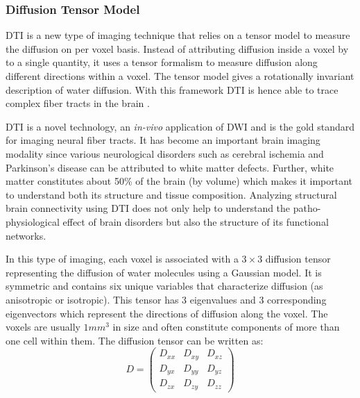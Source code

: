 \documentclass[msthesis.tex]{subfiles}
\begin{document}
\subsubsection{Diffusion Tensor Model}
\label{subsec:DTI}
\gls{DTI} is a new type of imaging technique that relies on a tensor model to measure the diffusion on per voxel basis. Instead of attributing diffusion inside a voxel by to a single quantity, it uses a tensor formalism to measure diffusion along different directions within a voxel. The tensor model gives a rotationally invariant description of water diffusion. With this framework \gls{DTI} is hence able to trace complex fiber tracts in the brain \citep{jones2010diffusion}.

\gls{DTI} is a novel technology, an \textit{in-vivo} application of DWI and is the gold standard for imaging neural fiber tracts. It has become an important brain imaging modality since various neurological disorders such as cerebral ischemia and Parkinson’s disease can be attributed to white matter defects. Further, white matter constitutes about 50\% of the brain (by volume) which makes it important to understand both its structure and tissue composition. Analyzing structural brain connectivity using \gls{DTI} does not only help to understand the patho-physiological effect of brain disorders but also the structure of its functional networks.

In this type of imaging, each voxel is associated with a $3 \times 3$ diffusion tensor representing the diffusion of water molecules using a Gaussian model. It is symmetric and contains six unique variables that characterize diffusion (as anisotropic or isotropic). This tensor has 3 eigenvalues and 3 corresponding eigenvectors which represent the directions of diffusion along the voxel. The voxels are usually $1 mm^3$ in size and often constitute components of more than one cell within them. The diffusion tensor can be written as:
\begin{equation}
D =
\begin{pmatrix}
D_{xx} & D_{xy} & D_{xz} \\
D_{yx} & D_{yy} & D_{yz} \\
D_{zx} & D_{zy} & D_{zz}
\end{pmatrix}  
\label{mat:difftensor}
\end{equation}
\end{document}
